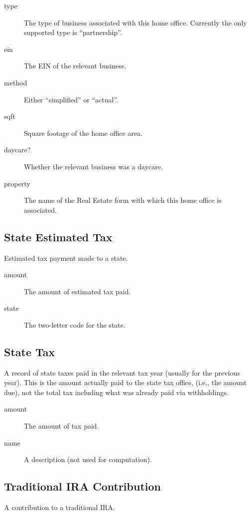 \documentclass[12pt]{article}
\begin{document}
\begin{description}
\item[type] The type of business associated with this home office. Currently the
only supported type is ``partnership''.
\item[ein] The EIN of the relevant business.
\item[method] Either ``simplified'' or ``actual''.
\item[sqft] Square footage of the home office area.
\item[daycare?] Whether the relevant business was a daycare.
\item[property] The name of the Real Estate form with which this home office is
associated.
\end{description}

\subsection{State Estimated Tax}

Estimated tax payment made to a state.

\begin{description}
\item[amount] The amount of estimated tax paid.
\item[state] The two-letter code for the state.
\end{description}




\subsection{State Tax}

A record of state taxes paid in the relevant tax year (usually for the previous
year). This is the amount actually paid to the state tax office, (i.e., the
amount due), not the total tax including what was already paid via withholdings.

\begin{description}
\item[amount] The amount of tax paid.
\item[name] A description (not used for computation).
\end{description}

\subsection{Traditional IRA Contribution}

A contribution to a traditional IRA.
\end{document}
